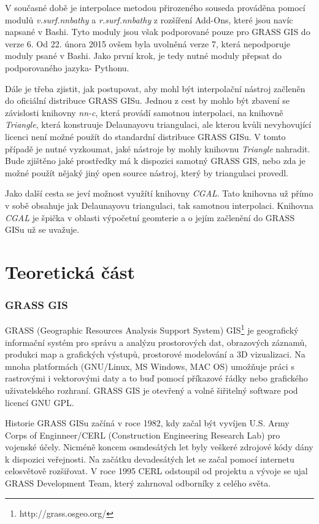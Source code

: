 \documentclass[12pt,a4paper]{article}
\begin{document}
V současné době je interpolace metodou přirozeného souseda prováděna pomocí modulů \emph{v.surf.nnbathy} a \emph{r.surf.nnbathy} z rozšíření Add-Ons, které jsou navíc napsané v Bashi. Tyto moduly jsou však podporované pouze pro GRASS GIS do verze 6. Od 22. února 2015 ovšem byla uvolněná verze 7, která nepodporuje moduly psané v Bashi. Jako první krok, je tedy nutné moduly přepsat do podporovaného jazyka- Pythonu. 

\newpage
Dále je třeba zjistit, jak postupovat, aby mohl být interpolační nástroj začleněn do oficiální distribuce GRASS GISu. Jednou z cest by mohlo být zbavení se závislosti knihovny \emph{nn-c}, která provádí samotnou interpolaci, na knihovně \emph{Triangle}, která konstruuje Delaunayovu triangulaci, ale kterou kvůli nevyhovující licenci není možné použít do standardní distribuce GRASS GISu. V tomto případě je nutné vyzkoumat, jaké nástroje by mohly knihovnu \emph{Triangle} nahradit. Bude zjištěno jaké prostředky má k dispozici samotný GRASS GIS, nebo zda je možné použít nějaký jiný open source nástroj, který by triangulaci provedl.

Jako další cesta se jeví možnost využítí knihovny \emph{CGAL}. Tato knihovna už přímo v sobě obsahuje jak Delaunayovu triangulaci, tak samotnou interpolaci. Knihovna \emph{CGAL} je špička v oblasti výpočetní geomterie a o jejím začlenění do GRASS GISu už se uvažuje.

\newpage
\part{Teoretická část}

\newpage
\section{GRASS GIS}
GRASS (Geographic Resources Analysis Support System) GIS\footnote{http://grass.osgeo.org/} je geografický informační systém pro správu a analýzu prostorových dat, obrazových záznamů, produkci map a grafických výstupů, prostorové modelování a 3D vizualizaci. Na mnoha platformách (GNU/Linux, MS Windows, MAC OS) umožňuje práci s rastrovými i vektorovými daty a to buď pomocí příkazové řádky nebo grafického uživatelského rozhraní. GRASS GIS je otevřený a volně šiřitelný software pod licencí GNU GPL.

Historie\cite{rukovet} GRASS GISu začíná v roce 1982, kdy začal být vyvíjen U.S. Army Corps of Enginneer/CERL (Construction Engineering Research Lab) pro vojenské účely. Nicméně koncem osmdesátých let byly veškeré zdrojové kódy dány k dispozici veřejnosti. Na začátku devadesátých let se začal pomocí internetu celosvětově rozšiřovat. V roce 1995 CERL odstoupil od projektu a vývoje se ujal GRASS Development Team, který zahrnoval odborníky z celého světa.
\end{document}
